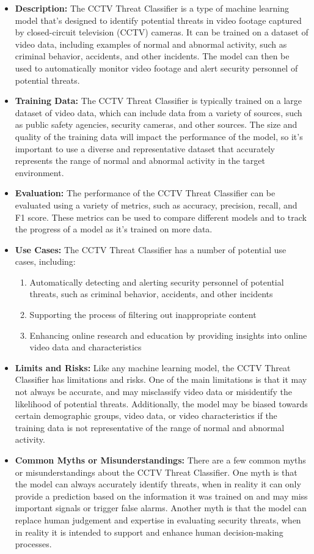 \begin{itemize}
    \item \textbf{Description:} The CCTV Threat Classifier is a type of machine learning model that's designed to identify potential threats in video footage captured by closed-circuit television (CCTV) cameras. It can be trained on a dataset of video data, including examples of normal and abnormal activity, such as criminal behavior, accidents, and other incidents. The model can then be used to automatically monitor video footage and alert security personnel of potential threats.
    \item \textbf{Training Data:} The CCTV Threat Classifier is typically trained on a large dataset of video data, which can include data from a variety of sources, such as public safety agencies, security cameras, and other sources. The size and quality of the training data will impact the performance of the model, so it's important to use a diverse and representative dataset that accurately represents the range of normal and abnormal activity in the target environment.
    \item \textbf{Evaluation:} The performance of the CCTV Threat Classifier can be evaluated using a variety of metrics, such as accuracy, precision, recall, and F1 score. These metrics can be used to compare different models and to track the progress of a model as it's trained on more data.
    \item \textbf{Use Cases:} The CCTV Threat Classifier has a number of potential use cases, including:
        \begin{enumerate}  
            \item Automatically detecting and alerting security personnel of potential threats, such as criminal behavior, accidents, and other incidents
            \item Supporting the process of filtering out inappropriate content
            \item Enhancing online research and education by providing insights into online video data and characteristics
        \end{enumerate}
    \item \textbf{Limits and Risks:} Like any machine learning model, the CCTV Threat Classifier has limitations and risks. One of the main limitations is that it may not always be accurate, and may misclassify video data or misidentify the likelihood of potential threats. Additionally, the model may be biased towards certain demographic groups, video data, or video characteristics if the training data is not representative of the range of normal and abnormal activity.
    \item \textbf{Common Myths or Misunderstandings:} There are a few common myths or misunderstandings about the CCTV Threat Classifier. One myth is that the model can always accurately identify threats, when in reality it can only provide a prediction based on the information it was trained on and may miss important signals or trigger false alarms. Another myth is that the model can replace human judgement and expertise in evaluating security threats, when in reality it is intended to support and enhance human decision-making processes.
\end{itemize}

